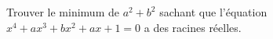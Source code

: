 Trouver le minimum de $a^2 + b^2$ sachant que l'équation $x^4 + ax^3 + bx^2 + ax + 1 = 0$ a des racines réelles.
